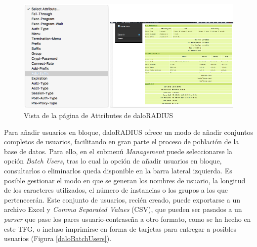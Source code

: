 \begin{figure}[!t]
\begin{center}
\includegraphics[width=0.75\linewidth]{./5_AnalisisOrganico/Img/daloAttributes.png}
\end{center}
\caption{Vista de la página de Attributes de daloRADIUS}
\label{daloAttributes}
\end{figure}

Para añadir usuarios en bloque, daloRADIUS ofrece un modo de añadir conjuntos completos de usuarios, facilitando en gran parte el proceso de población de la base de datos. Para ello, en el submenú \emph{Management} puede seleccionarse la opción \emph{Batch Users}, tras lo cual la opción de añadir usuarios en bloque, consultarlos o eliminarlos queda disponible en la barra lateral izquierda. Es posible gestionar el modo en que se generan los nombres de usuario, la longitud de los caracteres utilizados, el número de instancias o los grupos a los que pertenecerán. Este conjunto de usuarios, recién creado, puede exportarse a un archivo Excel y \emph{Comma Separated Values} (\acrshort{CSV}), que pueden ser pasados a un \emph{parser} que pase los pares usuario-contraseña a otro formato, como se ha hecho en este TFG, o incluso imprimirse en forma de tarjetas para entregar a posibles usuarios (Figura \ref{daloBatchUsers}).

